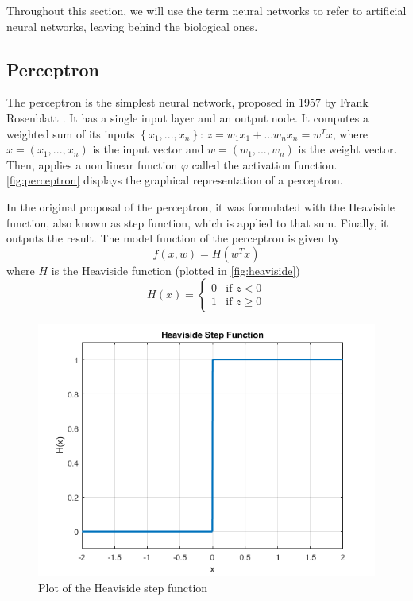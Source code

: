 Throughout this section, we will use the term neural networks to refer to artificial neural networks, leaving behind the biological ones.

\subsection{Perceptron}
The perceptron is the simplest neural network, proposed in 1957 by Frank Rosenblatt \cite{rosenblatt1958perceptron}. It has a single input layer and an output node. It computes a weighted sum of its inputs $\left\lbrace x_1,...,x_n\right\rbrace$: $z = w_1x_1+...w_nx_n = w^T x$, where $x=(x_1,...,x_n)$ is the input vector and $w = (w_1,...,w_n)$ is the weight vector. Then, applies a non linear function $\varphi$ called the activation function. \autoref{fig:perceptron} displays the graphical representation of a perceptron.

In the original proposal of the perceptron, it was formulated with the Heaviside function, also known as step function, which is applied to that sum. Finally, it outputs the result. The model function of the perceptron is given by
\begin{equation}
    f(x,w)=H(w^T x)
\end{equation}
where $H$ is the Heaviside function (plotted in \autoref{fig:heaviside})
\begin{equation}
    H(x) =
    \begin{cases}
    0 & \text{if } z < 0 \\
    1 & \text{if } z \geq 0
    \end{cases}
\end{equation}

\begin{figure}
    \centering
    \includegraphics[width=0.7\linewidth]{img/img-ch1/heaviside_graph.png}
    \caption{Plot of the Heaviside step function}
    \label{fig:heaviside}
\end{figure}

